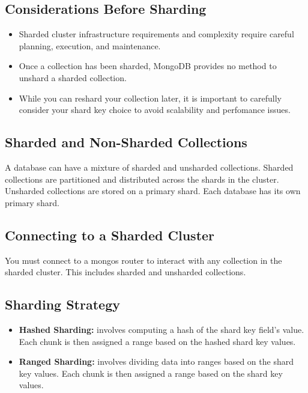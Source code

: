 \subsection{Considerations Before Sharding}
\begin{itemize}
    \item Sharded cluster infrastructure requirements and complexity require careful planning, execution, and maintenance.
    \item Once a collection has been sharded, MongoDB provides no method to unshard a sharded collection.
    \item While you can reshard your collection later, it is important to carefully consider your shard key choice to avoid scalability and perfomance issues.
\end{itemize}

\subsection{Sharded and Non-Sharded Collections}
A database can have a mixture of sharded and unsharded collections. Sharded collections are partitioned and distributed across the shards in the cluster. Unsharded collections are stored on a primary shard. Each database has its own primary shard.

\subsection{Connecting to a Sharded Cluster}
You must connect to a mongos router to interact with any collection in the sharded cluster. This includes sharded and unsharded collections.

\subsection{Sharding Strategy}
\begin{itemize}
    \item \textbf{Hashed Sharding:} involves computing a hash of the shard key field's value. Each chunk is then assigned a range based on the hashed shard key values.
    \item \textbf{Ranged Sharding:} involves dividing data into ranges based on the shard key values. Each chunk is then assigned a range based on the shard key values.
\end{itemize}

